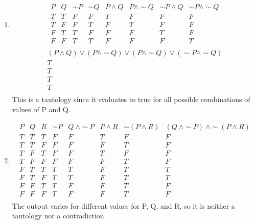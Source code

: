 \documentclass[12pt,letterpaper]{article}
\begin{document}
\begin{enumerate}[label= \textbf{\alph*)}]
		\item \begin{displaymath}
			\begin{array}{|c|c|c|c|c|c|c|c|c|}
				P &
				Q &
				\sim P &
				\sim Q &
				P \land Q &
				P \land \sim Q &
				\sim P \land Q &
				\sim P \land \sim Q\\ 
				\hline
				T & T & F & F & T & F & F & F\\
				T & F & F & T & F & T & F & F\\
				F & T & T & F & F & F & T & F\\
				F & F & T & T & F & F & F & T\\
			\end{array}
		\end{displaymath}
		\begin{displaymath}
			\begin{array}{|c|}
				(P \land Q) \lor (P \land \sim Q) \lor (P \land \sim Q) \lor (\sim P \land \sim Q)\\ 
			\hline
			T\\
			T\\
			T\\
			T\\
			\end{array}
		\end{displaymath}
		This is  a tautology since it evaluates to true for all possible combinations
		of values of P and Q.

		\item \begin{displaymath}
			\begin{array}{|c|c|c|c|c|c|c|c|}
				P &
				Q &
				R &
				\sim P &
				Q\ \land \sim P &
				P \land R &
				\sim (P \land R) &
				(Q\ \land \sim P)\ \land \sim (P \land R)\\ 
				\hline
				T & T & T & F & F & T & F & F\\
				T & T & F & F & F & F & T & F\\
				T & F & T & F & F & T & F & F\\
				T & F & F & F & F & F & T & F\\
				F & T & T & T & T & F & T & T\\
				F & T & F & T & T & F & T & T\\
				F & F & T & T & F & F & T & F\\
				F & F & F & T & F & F & T & F\\
			\end{array}
		\end{displaymath}
		The output varies for different values for P, Q, and R, so it is neither a tautology nor a contradiction.


\end{enumerate}
\end{document}
